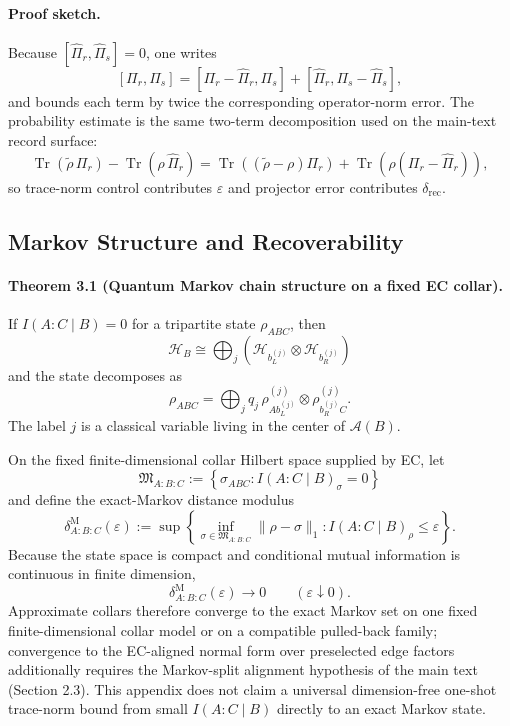 \paragraph{\textbf{Proof sketch.}}
Because \([\widehat\Pi_r,\widehat\Pi_s]=0\), one writes
\[
[\Pi_r,\Pi_s]
=
[\Pi_r-\widehat\Pi_r,\Pi_s]
+
[\widehat\Pi_r,\Pi_s-\widehat\Pi_s],
\]
and bounds each term by twice the corresponding operator-norm error. The probability estimate is
the same two-term decomposition used on the main-text record surface:
\[
\operatorname{Tr}(\widetilde\rho\,\Pi_r)-\operatorname{Tr}(\rho\,\widehat\Pi_r)
=
\operatorname{Tr}((\widetilde\rho-\rho)\Pi_r)
+
\operatorname{Tr}(\rho(\Pi_r-\widehat\Pi_r)),
\]
so trace-norm control contributes \(\varepsilon\) and projector error contributes
\(\delta_{\mathrm{rec}}\).

\subsection{Markov Structure and Recoverability}

\paragraph{\textbf{Theorem 3.1 (Quantum Markov chain structure on a fixed EC collar).}}
If \(I(A:C\mid B)=0\) for a tripartite state \(\rho_{ABC}\), then
\[
\mathcal H_B
\cong
\bigoplus_j
\left(
\mathcal H_{b_L^{(j)}}\otimes \mathcal H_{b_R^{(j)}}
\right)
\]
and the state decomposes as
\[
\rho_{ABC}
=
\bigoplus_j
q_j\,
\rho^{(j)}_{A b_L^{(j)}}\otimes \rho^{(j)}_{b_R^{(j)} C}.
\]
The label \(j\) is a classical variable living in the center of \(\mathcal A(B)\).

On the fixed finite-dimensional collar Hilbert space supplied by EC, let
\[
\mathfrak M_{A:B:C}
:=
\left\{
\sigma_{ABC}: I(A:C\mid B)_\sigma=0
\right\}
\]
and define the exact-Markov distance modulus
\[
\delta^{\mathrm M}_{A:B:C}(\varepsilon)
:=
\sup\left\{
\inf_{\sigma\in\mathfrak M_{A:B:C}}\|\rho-\sigma\|_1:
I(A:C\mid B)_\rho\le\varepsilon
\right\}.
\]
Because the state space is compact and conditional mutual information is continuous in finite
dimension,
\[
\delta^{\mathrm M}_{A:B:C}(\varepsilon)\longrightarrow0
\qquad
(\varepsilon\downarrow0).
\]
Approximate collars therefore converge to the exact Markov set on one fixed
finite-dimensional collar model or on a compatible pulled-back family; convergence to the
EC-aligned normal form over preselected edge factors additionally requires the Markov-split
alignment hypothesis of the main text (Section 2.3). This appendix does not
claim a universal dimension-free one-shot trace-norm bound from small \(I(A:C\mid B)\) directly
to an exact Markov state.

